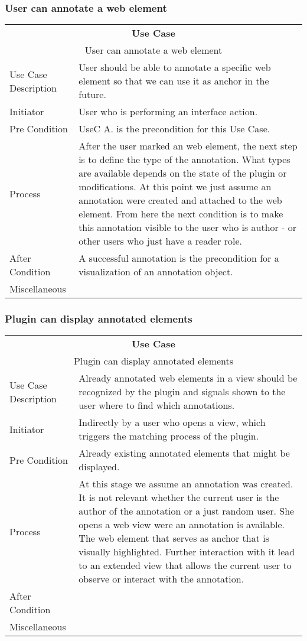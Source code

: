 \subsubsection[Web Element Annotating]{User can annotate a web element}
\begin{tabular}{|l| p{6cm} |}
\hline 
 \multicolumn{2}{|c|}{\textbf{Use Case }} \\ 
 \multicolumn{2}{|c|}{User can annotate a web element} \\ 
\hline 
Use Case Description & User should be able to annotate a specific web element so that we can use it as anchor in the future. \\ 
\hline 
Initiator & User who is performing an interface action. \\ 
\hline 
Pre Condition & UseC A. is the precondition for this Use Case. \\ 
\hline 
Process & After the user marked an web element, the next step is to define the type of the annotation. What types are available depends on the state of the plugin or modifications. At this point we just assume an annotation were created and attached to the web element. From here the next condition is to make this annotation visible to the user who is author - or other users who just have a reader role. \\ 
\hline 
After Condition & A successful annotation is the precondition for a visualization of an annotation object. \\ 
\hline 
Miscellaneous &  \\ 
\hline 
\end{tabular} 

\subsubsection[Displaying Annotations]{Plugin can display annotated elements}
\begin{tabular}{|l| p{6cm} |}
\hline 
 \multicolumn{2}{|c|}{\textbf{Use Case}} \\ 
 \multicolumn{2}{|c|}{Plugin can display annotated elements} \\ 
\hline 
Use Case Description & Already annotated web elements in a view should be recognized by the plugin and signals shown to the user where to find which annotations. \\ 
\hline 
Initiator & Indirectly by a user who opens a view, which triggers the matching process of the plugin. \\ 
\hline 
Pre Condition & Already existing annotated elements that might be displayed.  \\ 
\hline 
Process & At this stage we assume an annotation was created. It is not relevant whether the current user is the author of the annotation or a just random user. She opens a web view were an annotation is available. The web element that serves as anchor that is visually highlighted. Further interaction with it lead to an extended view that allows the current user to observe or interact with the annotation. \\ 
\hline 
After Condition & \\ 
\hline 
Miscellaneous & \\ 
\hline 
\end{tabular} 

